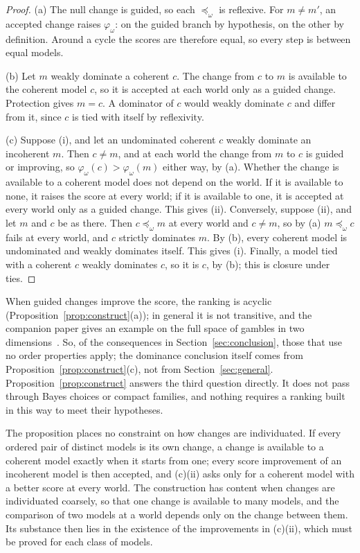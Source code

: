 \documentclass[11pt]{article}
\theoremstyle{definition}
\theoremstyle{remark}
\begin{document}
\begin{proof}
(a) The null change is guided, so each $\preceq_\omega$ is reflexive. For $m\ne m'$, an accepted change raises $\varphi_\omega$: on the guided branch by hypothesis, on the other by definition. Around a cycle the scores are therefore equal, so every step is between equal models.

(b) Let $m$ weakly dominate a coherent $c$. The change from $c$ to $m$ is available to the coherent model $c$, so it is accepted at each world only as a guided change. Protection gives $m=c$. A dominator of $c$ would weakly dominate $c$ and differ from it, since $c$ is tied with itself by reflexivity.

(c) Suppose (i), and let an undominated coherent $c$ weakly dominate an incoherent $m$. Then $c\ne m$, and at each world the change from $m$ to $c$ is guided or improving, so $\varphi_\omega(c)>\varphi_\omega(m)$ either way, by (a). Whether the change is available to a coherent model does not depend on the world. If it is available to none, it raises the score at every world; if it is available to one, it is accepted at every world only as a guided change. This gives (ii). Conversely, suppose (ii), and let $m$ and $c$ be as there. Then $c\preceq_\omega m$ at every world and $c\ne m$, so by (a) $m\preceq_\omega c$ fails at every world, and $c$ strictly dominates $m$. By (b), every coherent model is undominated and weakly dominates itself. This gives (i). Finally, a model tied with a coherent $c$ weakly dominates $c$, so it is $c$, by (b); this is closure under ties.
\end{proof}

When guided changes improve the score, the ranking is acyclic (Proposition~\ref{prop:construct}(a)); in general it is not transitive, and the companion paper gives an example on the full space of gambles in two dimensions~\cite{KCM}. So, of the consequences in Section~\ref{sec:conclusion}, those that use no order properties apply; the dominance conclusion itself comes from Proposition~\ref{prop:construct}(c), not from Section~\ref{sec:general}. Proposition~\ref{prop:construct} answers the third question directly. It does not pass through Bayes choices or compact families, and nothing requires a ranking built in this way to meet their hypotheses.

The proposition places no constraint on how changes are individuated. If every ordered pair of distinct models is its own change, a change is available to a coherent model exactly when it starts from one; every score improvement of an incoherent model is then accepted, and (c)(ii) asks only for a coherent model with a better score at every world. The construction has content when changes are individuated coarsely, so that one change is available to many models, and the comparison of two models at a world depends only on the change between them. Its substance then lies in the existence of the improvements in (c)(ii), which must be proved for each class of models.
\end{document}
